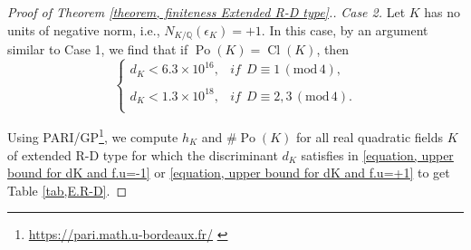 \documentclass[12pt]{amsart}
\theoremstyle{definition}
\numberwithin{equation}{section}
\DeclareMathOperator{\Po}{Po}
\DeclareMathOperator{\Cl}{Cl}
\begin{document}
\begin{proof}[Proof of Theorem \ref{theorem, finiteness Extended R-D type}.]
		\noindent
	\textit{Case 2.} Let $K$ has no units of negative norm, i.e., $N_{K/\mathbb{Q}}(\epsilon_K)=+1$. In this case,  
	 by an argument similar to Case 1, we find that if $\Po(K)=\Cl(K)$, then
		\begin{equation} \label{equation, upper bound for dK and f.u=+1}
			\left\{
			\begin{array}{ll}
				d_K < 6.3\times 10^{16}, & \textit{if} ~~ D \equiv 1 \, (\mathrm{mod}\, 4),\\
				& \\
				d_K < 1.3 \times 10^{18},  & \textit{if} ~~ D \equiv 2,3 \, (\mathrm{mod}\, 4).\\
			\end{array}
			\right.
		\end{equation}

Using PARI/GP\footnote{\url{https://pari.math.u-bordeaux.fr/} \label{1}}, we compute $h_K$ and $\# \Po(K)$ for all real quadratic fields $K$ of extended R-D type for which the discriminant $d_K$ satisfies  in \eqref{equation, upper bound for dK and f.u=-1} or \eqref{equation, upper bound for dK and f.u=+1}  to get Table \ref{tab,E.R-D}. %
\end{proof}
\end{document}
